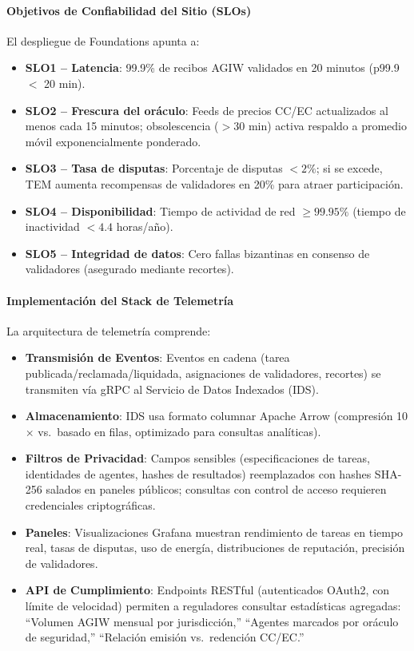 \documentclass[11pt]{article}
\begin{document}
\paragraph{Objetivos de Confiabilidad del Sitio (SLOs)} El despliegue de Foundations apunta a:
\begin{itemize}[noitemsep]
  \item \textbf{SLO1 -- Latencia}: 99.9\% de recibos AGIW validados en 20 minutos (p99.9 $<$ 20 min).
  \item \textbf{SLO2 -- Frescura del oráculo}: Feeds de precios CC/EC actualizados al menos cada 15 minutos; obsolescencia ($>30$ min) activa respaldo a promedio móvil exponencialmente ponderado.
  \item \textbf{SLO3 -- Tasa de disputas}: Porcentaje de disputas $<2\%$; si se excede, TEM aumenta recompensas de validadores en 20\% para atraer participación.
  \item \textbf{SLO4 -- Disponibilidad}: Tiempo de actividad de red $\geq 99.95\%$ (tiempo de inactividad $<4.4$ horas/año).
  \item \textbf{SLO5 -- Integridad de datos}: Cero fallas bizantinas en consenso de validadores (asegurado mediante recortes).
\end{itemize}

\paragraph{Implementación del Stack de Telemetría} La arquitectura de telemetría comprende:
\begin{itemize}[noitemsep]
  \item \textbf{Transmisión de Eventos}: Eventos en cadena (tarea publicada/reclamada/liquidada, asignaciones de validadores, recortes) se transmiten vía gRPC al Servicio de Datos Indexados (IDS).
  \item \textbf{Almacenamiento}: IDS usa formato columnar Apache Arrow (compresión 10$\times$ vs.\ basado en filas, optimizado para consultas analíticas).
  \item \textbf{Filtros de Privacidad}: Campos sensibles (especificaciones de tareas, identidades de agentes, hashes de resultados) reemplazados con hashes SHA-256 salados en paneles públicos; consultas con control de acceso requieren credenciales criptográficas.
  \item \textbf{Paneles}: Visualizaciones Grafana muestran rendimiento de tareas en tiempo real, tasas de disputas, uso de energía, distribuciones de reputación, precisión de validadores.
  \item \textbf{API de Cumplimiento}: Endpoints RESTful (autenticados OAuth2, con límite de velocidad) permiten a reguladores consultar estadísticas agregadas: ``Volumen AGIW mensual por jurisdicción,'' ``Agentes marcados por oráculo de seguridad,'' ``Relación emisión vs.\ redención CC/EC.''
\end{itemize}
\end{document}
